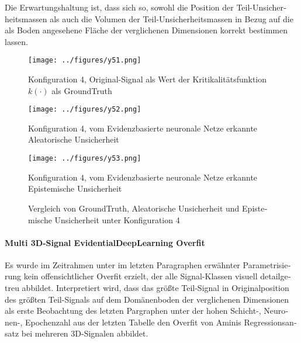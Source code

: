 \begin{otherlanguage}{ngerman}
Die Erwartungshaltung ist, dass sich so, sowohl die Position der Teil-Unsicherheitsmassen als auch die Volumen der Teil-Unsicherheitsmassen in Bezug auf die als Boden angesehene Fläche der verglichenen Dimensionen korrekt bestimmen lassen. 



\begin{figure}[!ht]
  \centering

  \begin{minipage}[t]{0.32\textwidth}
    \centering
    \texttt{[image: ../figures/y51.png]}
    \caption*{Konfiguration 4, Original-Signal als Wert der Kritikalitätsfunktion \(k(\cdot)\) als \gls{GroundTruth}}
    \label{fig:bild41}
  \end{minipage}
  \hfill
  \begin{minipage}[t]{0.32\textwidth}
    \centering
    \texttt{[image: ../figures/y52.png]}
    \caption*{Konfiguration 4, vom \gls{Evidenzbasierte neuronale Netze} erkannte \gls{Aleatorische Unsicherheit}}
    \label{fig:bild42}
  \end{minipage}
  \hfill
  \begin{minipage}[t]{0.32\textwidth}
    \centering
    \texttt{[image: ../figures/y53.png]}
    \caption*{Konfiguration 4, vom \gls{Evidenzbasierte neuronale Netze} erkannte \gls{Epistemische Unsicherheit}}
    \label{fig:bild43}
  \end{minipage}

  \caption{Vergleich von \gls{GroundTruth}, \gls{Aleatorische Unsicherheit} und \gls{Epistemische Unsicherheit} unter Konfiguration 4}
  \label{fig:three_subfigures4}
\end{figure}



\paragraph{Multi 3D-Signal \gls{EvidentialDeepLearning} Overfit} Es wurde im Zeitrahmen unter im letzten Paragraphen erwähnter Parametrisierung kein offensichtlicher Overfit erzielt, der alle Signal-Klassen visuell detailgetreu abbildet. Interpretiert wird, dass das größte Teil-Signal in Originalposition des größten Teil-Signals auf dem Domänenboden der verglichenen Dimensionen als erste Beobachtung des letzten Pargraphen unter der hohen Schicht-, Neuronen-, Epochenzahl aus der letzten Tabelle den Overfit von Aminis Regressionsansatz bei mehreren 3D-Signalen abbildet.  




\end{otherlanguage}
